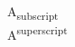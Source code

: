 \documentclass{article}
\begin{document}
    A\textsubscript{subscript} \\
    A\textsuperscript{superscript}
\end{document}
